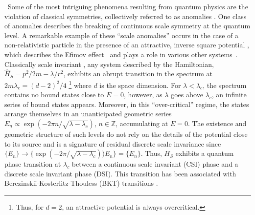\documentclass[aps,prl,reprint,preprintnumbers]{revtex4-1}
\begin{document}
{\ Some of the most intriguing phenomena resulting from quantum physics are the violation of classical symmetries, collectively referred to as anomalies \cite{PhysRev.177.2426,Bell1969,PhysRevD.34.674,1993AmJPh..61..142H}. One class of anomalies describes the breaking of continuous scale symmetry at the quantum level. A remarkable example of these ``scale anomalies'' occurs in the case of a non-relativistic particle in the presence of an attractive, inverse square potential \cite{Case1950,deAlfaro1976,landau1991quantum,Camblong:2000ec,PhysRevD.68.025006,Hammer:2005sa,Braaten2004,Kaplan:2009kr}, which describes the Efimov effect~\cite{efimov1970energy,Efimov1971,Braaten2006259} and plays a role in various other systems~\cite{levy1967electron,PhysRevB.46.12664,PhysRevD.48.5940,CamblongEpeleFanchiottiEtAl2001,nisoli2014attractive,Govindarajan:2000ag,Camblong:2003mz,Bellucci200399}. Classically scale invariant \cite{jackiw1995diverse}, any system described by the Hamiltonian, $ \hat{H}_S = p^2/2m-\lambda/r^2 $, exhibits an abrupt transition in the spectrum at $2 m \lambda_c = (d-2)^2/4$ \footnote{Thus, for $d=2$, an attractive potential is always overcritical.} where $d$ is the space dimension. For $\lambda < \lambda_c$, the spectrum contains no bound states close to $E=0$, however, as $\lambda$ goes above $\lambda_c$, an infinite series of bound states appears. Moreover, in this ``over-critical'' regime, the states arrange themselves in an unanticipated geometric series $E_n \propto \exp{(-2\pi n/\sqrt{\lambda-\lambda_{c}})}$, $n \in \mathbb{Z}$, accumulating at $E = 0$. The existence and geometric structure of such levels do not rely on the details of the potential close to its source and is a signature of residual discrete scale invariance since $\{E_n\} \rightarrow \{\exp{(-2\pi/\sqrt{\lambda-\lambda_{c}}))} E_n\} = \{E_{n}\}$. Thus, $H_S$ exhibits a quantum phase transition at $\lambda_c$ between a continuous scale invariant (CSI) phase and a discrete scale invariant phase (DSI). This transition has been associated with Berezinskii-Kosterlitz-Thouless (BKT) transitions \cite{PhysRevB.46.12664,Kaplan:2009kr,Jensen:2010ga,Jensen:2010vx,Jensen:2011af,2014JSP...156..268D,Gies:2015hia}.}
\end{document}
